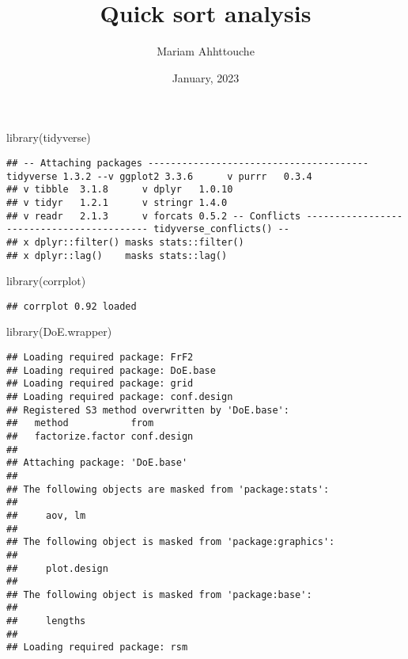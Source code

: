 \documentclass[
]{article}
\title{Quick sort analysis}
\author{Mariam Ahhttouche}
\date{January, 2023}
\newenvironment{Shaded}{\begin{snugshade}}{\end{snugshade}}
\newcommand{\FunctionTok}[1]{\textcolor[rgb]{0.00,0.00,0.00}{#1}}
\newcommand{\NormalTok}[1]{#1}
\begin{document}
\maketitle

\begin{Shaded}
\begin{Highlighting}[]
\FunctionTok{library}\NormalTok{(tidyverse)}
\end{Highlighting}
\end{Shaded}

\begin{verbatim}
## -- Attaching packages --------------------------------------- tidyverse 1.3.2 --v ggplot2 3.3.6      v purrr   0.3.4 
## v tibble  3.1.8      v dplyr   1.0.10
## v tidyr   1.2.1      v stringr 1.4.0 
## v readr   2.1.3      v forcats 0.5.2 -- Conflicts ------------------------------------------ tidyverse_conflicts() --
## x dplyr::filter() masks stats::filter()
## x dplyr::lag()    masks stats::lag()
\end{verbatim}

\begin{Shaded}
\begin{Highlighting}[]
\FunctionTok{library}\NormalTok{(corrplot)}
\end{Highlighting}
\end{Shaded}

\begin{verbatim}
## corrplot 0.92 loaded
\end{verbatim}

\begin{Shaded}
\begin{Highlighting}[]
\FunctionTok{library}\NormalTok{(DoE.wrapper)}
\end{Highlighting}
\end{Shaded}

\begin{verbatim}
## Loading required package: FrF2
## Loading required package: DoE.base
## Loading required package: grid
## Loading required package: conf.design
## Registered S3 method overwritten by 'DoE.base':
##   method           from       
##   factorize.factor conf.design
## 
## Attaching package: 'DoE.base'
## 
## The following objects are masked from 'package:stats':
## 
##     aov, lm
## 
## The following object is masked from 'package:graphics':
## 
##     plot.design
## 
## The following object is masked from 'package:base':
## 
##     lengths
## 
## Loading required package: rsm
\end{verbatim}
\end{document}
